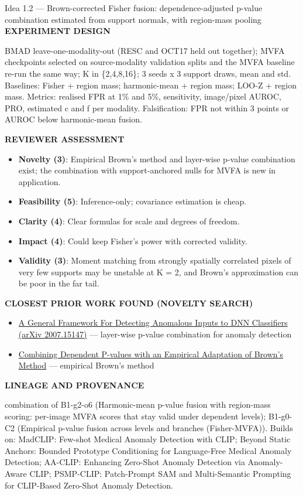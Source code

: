 \documentclass[11pt,a4paper]{article}
\newcommand{\lbl}[1]{{\sffamily\footnotesize\bfseries\color{muted}\MakeUppercase{#1}}\par}
\begin{document}
\begin{ideabox}{Idea 1.2 — Brown-corrected Fisher fusion: dependence-adjusted p-value combination estimated from support normals, with region-mass pooling}
\lbl{Experiment design}BMAD leave-one-modality-out (RESC and OCT17 held out together); MVFA checkpoints selected on source-modality validation splits and the MVFA baseline re-run the same way; K in \{2,4,8,16\}; 3 seeds x 3 support draws, mean and std. Baselines: Fisher + region mass; harmonic-mean + region mass; LOO-Z + region mass. Metrics: realised FPR at 1\% and 5\%, sensitivity, image/pixel AUROC, PRO, estimated c and f per modality. Falsification: FPR not within 3 points or AUROC below harmonic-mean fusion.

\lbl{Reviewer assessment}\begin{itemize}[leftmargin=1.2em,itemsep=1pt,topsep=2pt]
\item \textbf{Novelty (3)}: Empirical Brown's method and layer-wise p-value combination exist; the combination with support-anchored nulls for MVFA is new in application.
\item \textbf{Feasibility (5)}: Inference-only; covariance estimation is cheap.
\item \textbf{Clarity (4)}: Clear formulas for scale and degrees of freedom.
\item \textbf{Impact (4)}: Could keep Fisher's power with corrected validity.
\item \textbf{Validity (3)}: Moment matching from strongly spatially correlated pixels of very few supports may be unstable at K = 2, and Brown's approximation can be poor in the far tail.
\end{itemize}
\lbl{Closest prior work found (novelty search)}\begin{itemize}[leftmargin=1.2em,itemsep=1pt,topsep=2pt]
\item \href{https://arxiv.org/pdf/2007.15147}{A General Framework For Detecting Anomalous Inputs to DNN Classifiers (arXiv 2007.15147)} — layer-wise p-value combination for anomaly detection
\item \href{https://www.biorxiv.org/content/10.1101/029637.full.pdf}{Combining Dependent P-values with an Empirical Adaptation of Brown's Method} — empirical Brown's method
\end{itemize}
\lbl{Lineage and provenance}{\small combination of B1-g2-o6 (Harmonic-mean p-value fusion with region-mass scoring: per-image MVFA scores that stay valid under dependent levels); B1-g0-C2 (Empirical p-value fusion across levels and branches (Fisher-MVFA)). Builds on: MadCLIP: Few-shot Medical Anomaly Detection with CLIP; Beyond Static Anchors: Bounded Prototype Conditioning for Language-Free Medical Anomaly Detection; AA-CLIP: Enhancing Zero-Shot Anomaly Detection via Anomaly-Aware CLIP; PSMP-CLIP: Patch-Prompt SAM and Multi-Semantic Prompting for CLIP-Based Zero-Shot Anomaly Detection.}
\end{ideabox}
\end{document}
